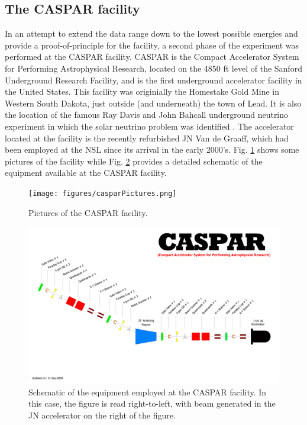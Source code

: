 \subsection{The CASPAR facility}
\label{sec: caspar}

In an attempt to extend the data range down to the lowest possible energies and provide a proof-of-principle for the facility, a second phase of the experiment was performed at the CASPAR facility. CASPAR is the Compact Accelerator System for Performing Astrophysical Research, located on the 4850 ft level of the Sanford Underground Research Facility, and is the first underground accelerator facility in the United States. This facility was originially the Homestake Gold Mine in Western South Dakota, just outside (and underneath) the town of Lead. It is also the location of the famous Ray Davis and John Bahcall underground neutrino experiment in which the solar neutrino problem was identified \cite{Bahcall1976}. The accelerator located at the facility is the recently refurbished JN Van de Graaff, which had been employed at the NSL since its arrival in the early 2000's. Fig. \ref{fig: casparPictures} shows some pictures of the facility while Fig. \ref{fig: casparSchematic} provides a detailed schematic of the equipment available at the CASPAR facility. 


\begin{figure}
\centering
\texttt{[image: figures/casparPictures.png]}
\caption{Pictures of the CASPAR facility. }
\label{fig: casparPictures}
\end{figure}



\begin{figure}
\centering
\includegraphics[width=\linewidth]{figures/casparSchematic.pdf}
\caption{Schematic of the equipment employed at the CASPAR facility. In this case, the figure is read right-to-left, with beam generated in the JN accelerator on the right of the figure. }
\label{fig: casparSchematic}
\end{figure}



